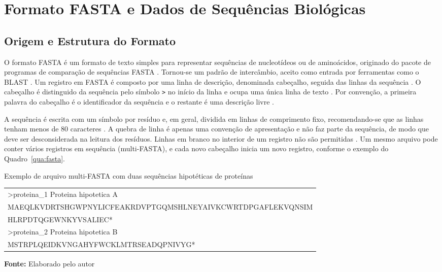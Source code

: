 \section{Formato FASTA e Dados de Sequências Biológicas}
\label{sec:fasta}

\subsection{Origem e Estrutura do Formato}

O formato FASTA é um formato de texto simples para representar sequências de nucleotídeos ou de aminoácidos, originado do pacote de programas de comparação de sequências FASTA \cite{PearsonLipman1988}. Tornou-se um padrão de intercâmbio, aceito como entrada por ferramentas como o BLAST \cite{NCBIBlast}. Um registro em FASTA é composto por uma linha de descrição, denominada cabeçalho, seguida das linhas da sequência \cite{NCBIBlast}. O cabeçalho é distinguido da sequência pelo símbolo \verb|>| no início da linha e ocupa uma única linha de texto \cite{NCBIBlast}. Por convenção, a primeira palavra do cabeçalho é o identificador da sequência e o restante é uma descrição livre \cite{NCBIBlast}.

A sequência é escrita com um símbolo por resíduo e, em geral, dividida em linhas de comprimento fixo, recomendando-se que as linhas tenham menos de 80 caracteres \cite{NCBIBlast}. A quebra de linha é apenas uma convenção de apresentação e não faz parte da sequência, de modo que deve ser desconsiderada na leitura dos resíduos. Linhas em branco no interior de um registro não são permitidas \cite{NCBIBlast}. Um mesmo arquivo pode conter vários registros em sequência (multi-FASTA), e cada novo cabeçalho inicia um novo registro, conforme o exemplo do Quadro~\ref{qua:fasta}.

\FloatBarrier
\begin{quadro}[!htbp]
	\centering
	\SingleSpacing\footnotesize
	\caption{Exemplo de arquivo multi-FASTA com duas sequências hipotéticas de proteínas}
	\begin{tabular}{|l|}
		\hline
		\ttfamily >proteina\_1 Proteina hipotetica A \\
		\ttfamily MAEQLKVDRTSHGWPNYLICFEAKRDVPTGQMSHLNEYAIVKCWRTDPGAFLEKVQNSIM \\
		\ttfamily HLRPDTQGEWNKYVSALIEC* \\
		\ttfamily >proteina\_2 Proteina hipotetica B \\
		\ttfamily MSTRPLQEIDKVNGAHYFWCKLMTRSEADQPNIVYG* \\
		\hline
	\end{tabular}
	\par\vspace{0.2cm}
	\textbf{Fonte:} Elaborado pelo autor
	\label{qua:fasta}
\end{quadro}
\FloatBarrier

